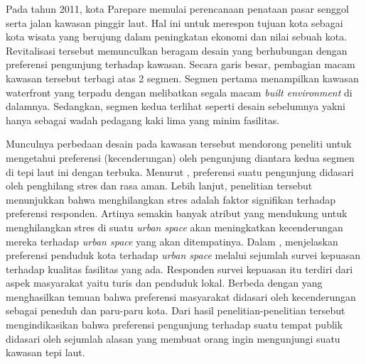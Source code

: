 \documentclass[../projects/thesis.tex]{subfiles}
\begin{document}
%
%
%



%
%
%

Pada tahun 2011, kota Parepare memulai perencanaan penataan pasar senggol serta jalan kawasan pinggir laut. Hal ini untuk merespon tujuan kota sebagai kota wisata yang berujung dalam peningkatan ekonomi dan nilai sebuah kota. Revitalisasi tersebut memunculkan beragam desain yang berhubungan dengan  preferensi pengunjung terhadap kawasan. Secara garis besar, pembagian macam kawasan tersebut terbagi atas 2 segmen. Segmen pertama menampilkan kawasan waterfront yang terpadu dengan melibatkan segala macam \textit{built environment} di dalamnya. Sedangkan, segmen kedua terlihat seperti desain sebelumnya yakni hanya sebagai wadah pedagang kaki lima yang minim fasilitas.

Munculnya perbedaan desain pada kawasan tersebut mendorong peneliti untuk mengetahui preferensi (kecenderungan) oleh pengunjung diantara kedua segmen di tepi laut ini dengan terbuka. Menurut \cite{thomas2020}, preferensi suatu pengunjung didasari oleh penghilang stres dan rasa aman. Lebih lanjut, penelitian tersebut menunjukkan bahwa menghilangkan stres adalah faktor signifikan terhadap preferensi responden. Artinya semakin banyak atribut yang mendukung untuk menghilangkan stres di suatu \textit{urban space} akan meningkatkan kecenderungan mereka terhadap \textit{urban space} yang akan ditempatinya.
Dalam \citep{wang2020}, menjelaskan preferensi penduduk kota terhadap \textit{urban space} melalui sejumlah survei kepuasan terhadap kualitas fasilitas yang ada. Responden survei kepuasan itu terdiri dari aspek masyarakat yaitu turis dan penduduk lokal.
Berbeda dengan \cite{imansari2015} yang menghasilkan temuan bahwa preferensi masyarakat didasari oleh kecenderungan sebagai peneduh dan paru-paru kota.
Dari hasil penelitian-penelitian tersebut mengindikasikan bahwa preferensi pengunjung terhadap suatu tempat publik didasari oleh sejumlah alasan yang membuat orang ingin mengunjungi suatu kawasan tepi laut.
\end{document}
